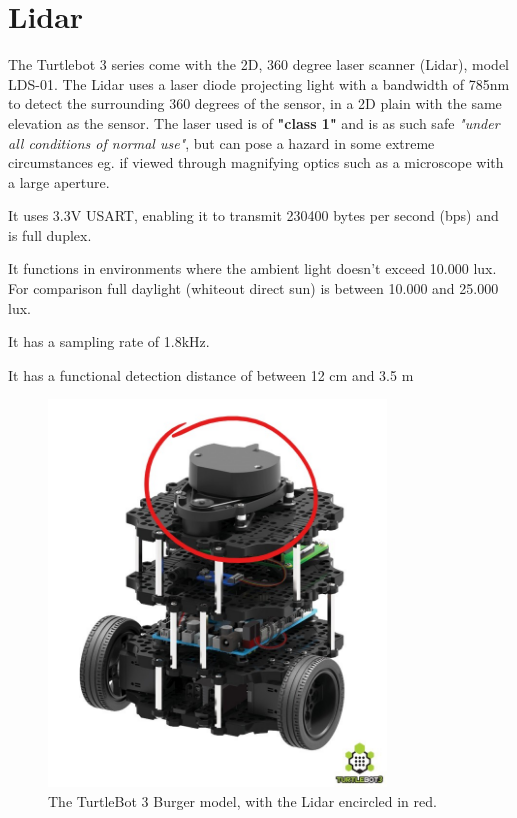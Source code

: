 

\section{Lidar} 
The Turtlebot 3 series come with the 2D, 360 degree laser scanner (Lidar), model LDS-01. The Lidar uses a laser diode projecting light with a bandwidth of 785nm to detect the surrounding 360 degrees of the sensor, in a 2D plain with the same elevation as the sensor. The laser used is of \textbf{"class 1"} and is as such safe \textit{"under all conditions of normal use"}\cite{Lasercla21:online}, but can pose a hazard in some extreme circumstances eg. if viewed through magnifying optics such as a microscope with a large aperture.\cite{2DLidar}
\begin{item}
\item It uses 3.3V USART, enabling it to transmit 230400 bytes per second (bps) and is full duplex. 
\item It functions in environments where the ambient light doesn't exceed 10.000 lux. For comparison full daylight (whiteout direct sun) is between 10.000 and 25.000 lux. 
\item It has a sampling rate of 1.8kHz.
\item It has a functional detection distance of between 12 cm and 3.5 m
\end{item}

\begin{figure}[H]
\centering
\includegraphics[width=0.8\textwidth]{Figures/ConAnalysis/General/Turtlebot3_burger-Lidar.jpg}
\caption{The TurtleBot 3 Burger model, with the Lidar encircled in red.}
\label{fig:TB3}
\end{figure}


